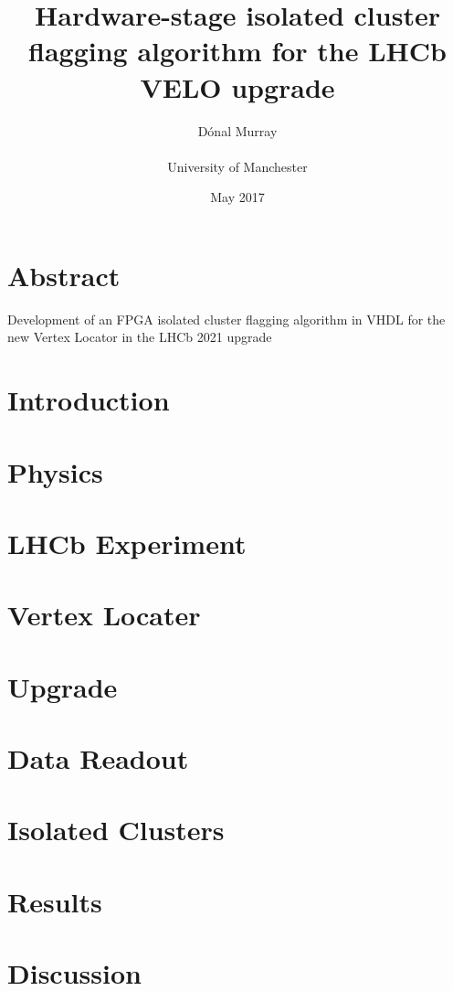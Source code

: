 \documentclass[11pt,a4paper,twoside]{article}
\title{\textbf{Hardware-stage isolated cluster flagging algorithm for the LHCb
				VELO upgrade}}
\author{D\'onal Murray\\\\University of Manchester}
\date{May 2017}
\begin{document}
	\maketitle
	\vfill
	\section*{Abstract}
	Development of an FPGA isolated cluster flagging algorithm in VHDL for the
	new Vertex Locator in the LHCb 2021 upgrade
	\vfill
	\clearpage

	\section{Introduction}
	

	\section{Physics}
	
	\section{LHCb Experiment}
	
	\section{Vertex Locater}
	
	\section{Upgrade}
	
	\section{Data Readout}
	
	\section{Isolated Clusters}
	

	\section{Results}
	

	\section{Discussion}
	
\end{document}
